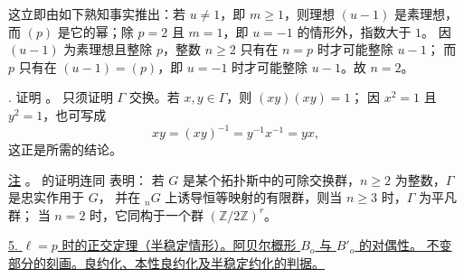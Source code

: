 这立即由如下熟知事实推出：若 $u\neq1$，即 $m\geq1$，则理想 $(u-1)$ 是素理想，
而 $(p)$ 是它的幂；除 $p=2$ 且 $m=1$，即 $u=-1$ 的情形外，指数大于 $1$。
因 $(u-1)$ 为素理想且整除 $p$，整数 $n\geq2$ 只有在 $n=p$ 时才可能整除 $u-1$；
而 $p$ 只有在 $(u-1)=(p)$，即 $u=-1$ 时才可能整除 $u-1$。故 $n=2$。

\smallskip
\noindent
{}. 证明 。
只须证明 $\Gamma$ 交换。若 $x,y\in\Gamma$，则 $(xy)(xy)=1$；
因 $x^2=1$ 且 $y^2=1$，也可写成
\[
 xy=(xy)^{-1}=y^{-1}x^{-1}=yx,
\]
这正是所需的结论。

\medskip
\noindent
\underline{注} 。
 的证明连同  表明：
若 $G$ 是某个拓扑斯中的可除交换群，$n\geq2$ 为整数，$\Gamma$ 是忠实作用于 $G$，
并在 ${}_nG$ 上诱导恒等映射的有限群，则当 $n\geq3$ 时，$\Gamma$ 为平凡群；
当 $n=2$ 时，它同构于一个群 $(\mathbb Z/2\mathbb Z)^r$。


%

\medskip
\noindent
\underline{5. $\ell=p$ 时的正交定理（半稳定情形）。阿贝尔概形 $B_o$ 与 $B'_o$ 的对偶性。
不变部分的刻画。良约化、本性良约化及半稳定约化的判据。}


